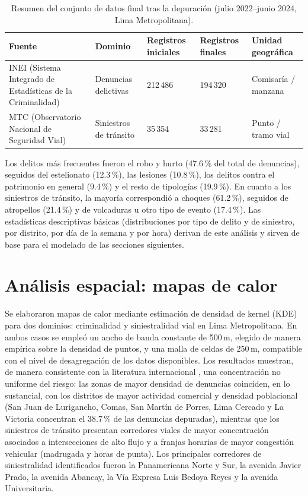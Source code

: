 \begin{table}[H]
\centering
\caption[Resumen del conjunto de datos final]{Resumen del conjunto de datos final tras la depuraci\'on (julio 2022--junio 2024, Lima Metropolitana).}
\setlength{\tabcolsep}{4pt}
\begin{tabular}{p{4.0cm}p{2.3cm}p{3.0cm}p{2.0cm}p{2.0cm}}
\toprule
Fuente & Dominio & Registros iniciales & Registros finales & Unidad geogr\'afica \\
\midrule
INEI (Sistema Integrado de Estad\'isticas de la Criminalidad) & Denuncias delictivas & 212\,486 & 194\,320 & Comisar\'ia / manzana \\
MTC (Observatorio Nacional de Seguridad Vial) & Siniestros de tr\'ansito & 35\,354 & 33\,281 & Punto / tramo vial \\
\bottomrule
\end{tabular}
\label{tab:datos}
\end{table}

Los delitos m\'as frecuentes fueron el robo y hurto (47.6\,\% del total de denuncias), seguidos del estelionato (12.3\,\%), las lesiones (10.8\,\%), los delitos contra el patrimonio en general (9.4\,\%) y el resto de tipolog\'ias (19.9\,\%). En cuanto a los siniestros de tr\'ansito, la mayor\'ia correspondi\'o a choques (61.2\,\%), seguidos de atropellos (21.4\,\%) y de volcaduras u otro tipo de evento (17.4\,\%). Las estad\'isticas descriptivas b\'asicas (distribuciones por tipo de delito y de siniestro, por distrito, por d\'ia de la semana y por hora) derivan de este an\'alisis y sirven de base para el modelado de las secciones siguientes.

\section{An\'alisis espacial: mapas de calor}

Se elaboraron mapas de calor mediante estimaci\'on de densidad de kernel (KDE) para dos dominios: criminalidad y siniestralidad vial en Lima Metropolitana. En ambos casos se emple\'o un ancho de banda constante de 500\,m, elegido de manera emp\'irica sobre la densidad de puntos, y una malla de celdas de 250\,m, compatible con el nivel de desagregaci\'on de los datos disponibles. Los resultados muestran, de manera consistente con la literatura internacional \citep{chainey2008kde,eck2005mapping}, una concentraci\'on no uniforme del riesgo: las zonas de mayor densidad de denuncias coinciden, en lo sustancial, con los distritos de mayor actividad comercial y densidad poblacional (San Juan de Lurigancho, Comas, San Mart\'in de Porres, Lima Cercado y La Victoria concentran el 38.7\,\% de las denuncias depuradas), mientras que los siniestros de tr\'ansito presentan corredores viales de mayor concentraci\'on asociados a intersecciones de alto flujo y a franjas horarias de mayor congesti\'on vehicular (madrugada y horas de punta). Los principales corredores de siniestralidad identificados fueron la Panamericana Norte y Sur, la avenida Javier Prado, la avenida Abancay, la V\'ia Expresa Luis Bedoya Reyes y la avenida Universitaria.

